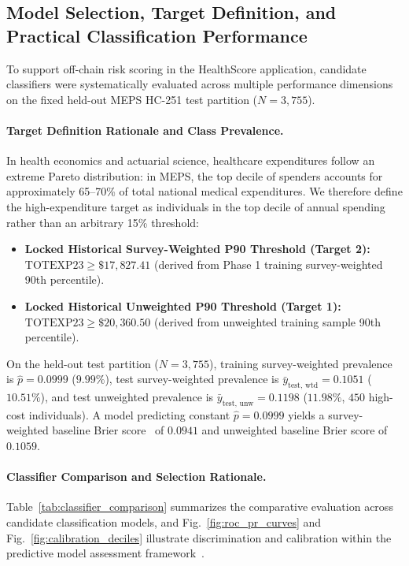 \documentclass[runningheads]{llncs}
\begin{document}
\subsection{Model Selection, Target Definition, and Practical Classification Performance}
To support off-chain risk scoring in the HealthScore application, candidate classifiers were systematically evaluated across multiple performance dimensions on the fixed held-out MEPS HC-251 test partition ($N=3,755$).

\paragraph{Target Definition Rationale and Class Prevalence.}
In health economics and actuarial science, healthcare expenditures follow an extreme Pareto distribution: in MEPS, the top decile of spenders accounts for approximately 65--70\% of total national medical expenditures. We therefore define the high-expenditure target as individuals in the top decile of annual spending rather than an arbitrary 15\% threshold:
\begin{itemize}
    \item \textbf{Locked Historical Survey-Weighted P90 Threshold (Target 2):} $\text{TOTEXP23} \ge \$17,827.41$ (derived from Phase 1 training survey-weighted 90th percentile).
    \item \textbf{Locked Historical Unweighted P90 Threshold (Target 1):} $\text{TOTEXP23} \ge \$20,360.50$ (derived from unweighted training sample 90th percentile).
\end{itemize}

On the held-out test partition ($N=3,755$), training survey-weighted prevalence is $\hat{p} = 0.0999$ ($9.99\%$), test survey-weighted prevalence is $\bar{y}_{\text{test, wtd}} = 0.1051$ ($10.51\%$), and test unweighted prevalence is $\bar{y}_{\text{test, unw}} = 0.1198$ ($11.98\%$, $450$ high-cost individuals). A model predicting constant $\hat{p} = 0.0999$ yields a survey-weighted baseline Brier score~\cite{brier1950verification} of $0.0941$ and unweighted baseline Brier score of $0.1059$.

\paragraph{Classifier Comparison and Selection Rationale.}
Table~\ref{tab:classifier_comparison} summarizes the comparative evaluation across candidate classification models, and Fig.~\ref{fig:roc_pr_curves} and Fig.~\ref{fig:calibration_deciles} illustrate discrimination and calibration within the predictive model assessment framework~\cite{steyerberg2010assessing}.
\end{document}
